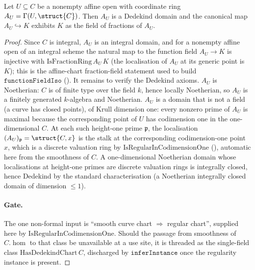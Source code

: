 \begin{proposition}
  \label{thm:adelic_chartRing_isDedekindDomain}
  Let \(U \subseteq C\) be a nonempty affine open with coordinate ring
  \(A_U = \Gamma(U, \struct{C})\). Then \(A_U\) is a Dedekind domain and
  the canonical map \(A_U \hookrightarrow K\) exhibits \(K\) as the field
  of fractions of \(A_U\).
\end{proposition}
\begin{proof}
  Since \(C\) is integral, \(A_U\) is an integral domain, and for a
  nonempty affine open of an integral scheme the natural map to the
  function field \(A_U \to K\) is injective with
  \(\mathrm{IsFractionRing}\, A_U\, K\) (the localisation of \(A_U\) at
  its generic point is \(K\)); this is the affine-chart fraction-field
  statement used to build \(\texttt{functionFieldIso}\)
  (). It remains to verify the Dedekind
  axioms. \(A_U\) is Noetherian: \(C\) is of finite type over the field
  \(k\), hence locally Noetherian, so \(A_U\) is a finitely generated
  \(k\)-algebra and Noetherian. \(A_U\) is a domain that is not a field
  (a curve has closed points), of Krull dimension one: every nonzero
  prime of \(A_U\) is maximal because the corresponding point of \(U\)
  has codimension one in the one-dimensional \(C\). At each such
  height-one prime \(\mathfrak p\), the localisation
  \((A_U)_{\mathfrak p} = \struct{C, x}\) is the stalk at the
  corresponding codimension-one point \(x\), which is a discrete
  valuation ring by \(\mathrm{IsRegularInCodimensionOne}\)
  (), automatic here from the
  smoothness of \(C\). A one-dimensional Noetherian domain whose
  localisations at height-one primes are discrete valuation rings is
  integrally closed, hence Dedekind by the standard characterisation
  (a Noetherian integrally closed domain of dimension \(\le 1\)).
  \paragraph{Gate.} The one non-formal input is ``smooth curve chart
  \(\Rightarrow\) regular chart'', supplied here by
  \(\mathrm{IsRegularInCodimensionOne}\). Should the passage from
  smoothness of \(C.\hom\) to that class be unavailable at a use site, it
  is threaded as the single-field class
  \(\mathrm{HasDedekindChart}\, C\), discharged by \(\texttt{inferInstance}\)
  once the regularity instance is present.
\end{proof}

